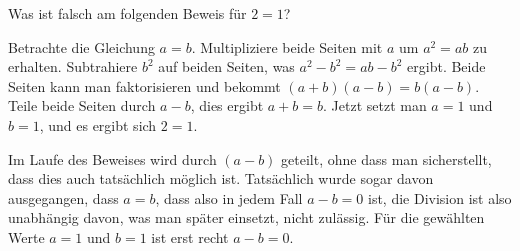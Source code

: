 Was ist falsch am folgenden Beweis für $2=1$?

Betrachte die Gleichung $a=b$. Multipliziere beide Seiten mit
$a$ um $a^2=ab$ zu erhalten. Subtrahiere $b^2$ auf beiden
Seiten, was $a^2-b^2=ab-b^2$ ergibt. Beide Seiten kann man
faktorisieren und bekommt $(a+b)(a-b)=b(a-b)$. Teile beide
Seiten durch $a-b$, dies ergibt $a+b=b$. Jetzt setzt man
$a=1$ und $b=1$, und es ergibt sich $2=1$.

\begin{loesung}
Im Laufe des Beweises wird durch $(a-b)$ geteilt, ohne dass man
sicherstellt, dass dies auch tatsächlich möglich ist.
Tatsächlich wurde sogar davon ausgegangen, dass $a=b$, dass
also in jedem Fall $a-b=0$ ist, die Division ist also unabhängig davon,
was man später einsetzt, nicht zulässig.
Für die
gewählten Werte $a=1$ und $b=1$  ist erst recht $a-b=0$.
\end{loesung}

